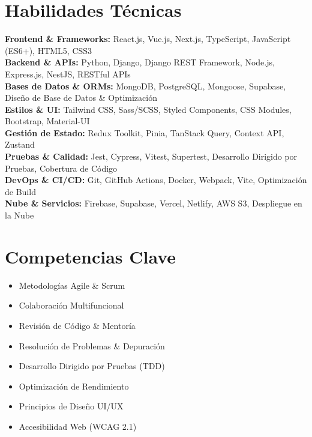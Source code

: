 \documentclass[10pt,a4paper]{article}
\begin{document}
\section*{Habilidades Técnicas}

\noindent
\textbf{\color{darkgray}Frontend \& Frameworks:} React.js, Vue.js, Next.js, TypeScript, JavaScript (ES6+), HTML5, CSS3 \\
\textbf{\color{darkgray}Backend \& APIs:} Python, Django, Django REST Framework, Node.js, Express.js, NestJS, RESTful APIs \\
\textbf{\color{darkgray}Bases de Datos \& ORMs:} MongoDB, PostgreSQL, Mongoose, Supabase, Diseño de Base de Datos \& Optimización \\
\textbf{\color{darkgray}Estilos \& UI:} Tailwind CSS, Sass/SCSS, Styled Components, CSS Modules, Bootstrap, Material-UI \\
\textbf{\color{darkgray}Gestión de Estado:} Redux Toolkit, Pinia, TanStack Query, Context API, Zustand \\
\textbf{\color{darkgray}Pruebas \& Calidad:} Jest, Cypress, Vitest, Supertest, Desarrollo Dirigido por Pruebas, Cobertura de Código \\
\textbf{\color{darkgray}DevOps \& CI/CD:} Git, GitHub Actions, Docker, Webpack, Vite, Optimización de Build \\
\textbf{\color{darkgray}Nube \& Servicios:} Firebase, Supabase, Vercel, Netlify, AWS S3, Despliegue en la Nube

\section*{Competencias Clave}

\noindent
\begin{minipage}[t]{0.48\textwidth}
  \begin{itemize}
    \item Metodologías Agile \& Scrum
    \item Colaboración Multifuncional
    \item Revisión de Código \& Mentoría
    \item Resolución de Problemas \& Depuración
  \end{itemize}
\end{minipage}%
\hfill
\begin{minipage}[t]{0.48\textwidth}
  \begin{itemize}
    \item Desarrollo Dirigido por Pruebas (TDD)
    \item Optimización de Rendimiento
    \item Principios de Diseño UI/UX
    \item Accesibilidad Web (WCAG 2.1)
  \end{itemize}
\end{minipage}
\end{document}
